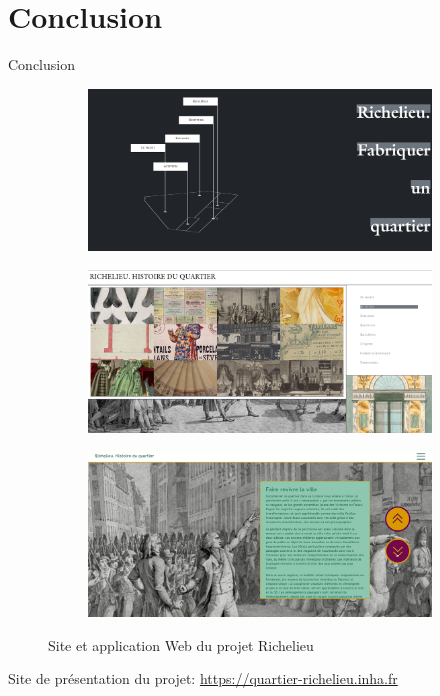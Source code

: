 \documentclass[8pt]{beamer}
\begin{document}
\section*{Conclusion}
\begin{frame}{Conclusion}
	\begin{figure}
		\begin{subfigure}{0.5\textwidth}
			\includegraphics[width=\textwidth]{includes/conclu0.png}
		\end{subfigure}
		\begin{subfigure}{0.5\textwidth}
			\includegraphics[width=\textwidth]{includes/conclu1.png}
		\end{subfigure}
		\begin{subfigure}{0.5\textwidth}
			\includegraphics[width=\textwidth]{includes/app_2.png}
		\end{subfigure}
		\caption{Site et application Web du projet Richelieu}
	\end{figure}
	\begin{center}
		Site de présentation du projet:
		\url{https://quartier-richelieu.inha.fr}
	\end{center}
\end{frame}
\end{document}
